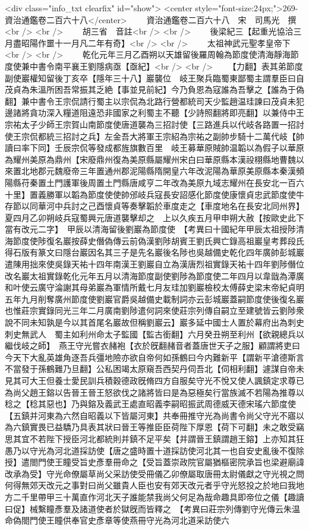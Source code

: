 <div class="info_txt clearfix" id="show">
<center style="font-size:24px;">269-資治通鑑卷二百六十八</center>
  　　資治通鑑卷二百六十八　宋　司馬光　撰<br />
<br />
　　胡三省　音註<br />
<br />
　　後梁紀三【起重光協洽三月盡昭陽作噩十一月凡二年有奇】<br />
<br />
　　太祖神武元聖孝皇帝下<br />
<br />
　　乾化元年三月乙酉朔以天雄留後羅周翰為節度使清海靜海節度使兼中書令南平襄王劉隱病亟【亟紀】<br />
<br />
　　【力翻】表其弟節度副使巖權知留後丁亥卒【隱年三十八】巖襲位　岐王聚兵臨蜀東鄙蜀主謂羣臣曰自茂貞為朱溫所困吾常振其乏絶【事並見前紀】今乃負恩為寇誰為吾擊之【誰為于偽翻】兼中書令王宗侃請行蜀主以宗侃為北路行營都統司天少監趙温珪諫曰茂貞未犯邊諸將貪功深入糧道阻遠恐非國家之利蜀主不聽【少詩照翻將即亮翻】以兼侍中王宗祐太子少師王宗賀山南節度使唐道襲為三招討使【三路進兵以代岐各路置一招討使王宗侃都統三招討之兵】左金吾大將軍王宗紹為宗祐之副帥步騎十二萬代岐【帥讀曰率下同】壬辰宗侃等發成都旌旗數百里　岐王募華原賊帥温韜以為假子以華原為耀州美原為鼎州【宋廢鼎州復為美原縣屬耀州宋白曰華原縣本漢祋栩縣地曹魏以來置北地郡元魏廢帝三年置通州郡泥陽縣隋開皇六年改泥陽為華原美原縣本秦漢頻陽縣苻秦置土門護軍後周置土門縣唐咸亨二年改為美原九域志耀州在長安北一百六十里】置義勝軍以韜為節度使使帥邠岐兵寇長安詔感化節度使康懷貞忠武節度使牛存節以同華河中兵討之己酉懷貞等奏擊韜於車度走之【車度地名在長安北同州界】　夏四月乙卯朔岐兵寇蜀興元唐道襲擊却之　上以久疾五月甲申朔大赦【按歐史此下當有改元二字】　甲辰以清海留後劉巖為節度使　【考異曰十國紀年甲辰太祖授陟清海節度使陟復名巖按薛史僭偽傳云前偽漢劉陟胡賓王劉氏興亡錄高祖巖皇考葬段氏得石版有篆文曰隱台巖因名其三子是先名巖後名陟也吳越備史乾化四年廣帥彭城巖遣陳用拙來使吳錄天祐十四年南漢王劉巖自立為漢唐烈祖實錄天祐十四年劉陟僭位改名巖太祖實錄乾化元年五月以清海節度副使劉陟為節度使二年四月以韋戩為潭廣和叶使云廣守淪謝其母弟巖為軍情所戴七月友珪加劉巖檢校太傅薛史梁末帝紀貞明五年九月削奪廣州節度使劉巖官爵吳越備史載制詞亦云彭城巖蓋嗣節度使後復名巖也惟莊宗實錄同光三年二月廣南劉陟遣何詞來使莊宗列傳自嗣立至建號皆云劉陟衆說不同未知孰是今以其首尾名巖故但稱劉巖云】巖多延中國士人置於幕府出為刺史刺史無武人　蜀主如利州命太子監國【監古銜翻】六月癸丑朔至利州【欲親總兵以繼伐岐之師】　燕王守光嘗衣赭袍【衣於旣翻赭音者蓋唐世天子之服】顧謂將吏曰今天下大亂英雄角逐吾兵彊地險亦欲自帝何如孫鶴曰今内難新平【謂新平滄德斯言不當發于孫鶴難乃旦翻】公私困竭太原窺吾西契丹伺吾北【伺相利翻】遽謀自帝未見其可大王但養士愛民訓兵積穀德政旣脩四方自服矣守光不悅又使人諷鎮定求尊已為尚父趙王鎔以告晉王晉王怒欲伐之諸將皆曰是為惡極矣行當族滅不若陽為推尊以稔之【稔其惡也】乃與鎔及義武王處直昭義李嗣昭振武周德威天德宋瑤六節度使【五鎮并河東為六然自昭義以下皆屬河東】共奉冊推守光為尚書令尚父守光不寤以為六鎮實畏已益驕乃具表其狀曰晉王等推臣臣荷陛下厚恩【荷下可翻】未之敢受竊思其宜不若陛下授臣河北都統則并鎮不足平矣【并謂晉王鎮謂趙王鎔】上亦知其狂愚乃以守光為河北道採訪使【唐之盛時置十道採訪使河北其一也自安史亂後不復除授】遣閤門使王瞳受旨史彥羣冊命之【受旨蓋崇政院官屬猶樞密院承旨也梁避廟諱改承為受】守光命僚屬草尚父采訪使受冊儀乙卯僚屬取唐冊太尉儀獻之守光視之問何得無郊天改元之事對曰尚父雖貴人臣也安有郊天改元者乎守光怒投之於地曰我地方二千里帶甲三十萬直作河北天子誰能禁我尚父何足為哉命趣具即帝位之儀【趣讀曰促】械繫瞳彥羣及諸道使者於獄旣而皆釋之　【考異曰莊宗列傳劉守光傳云朱温命偽閤門使王瞳供奉官史彥章等使燕冊守光為河北道采訪使六